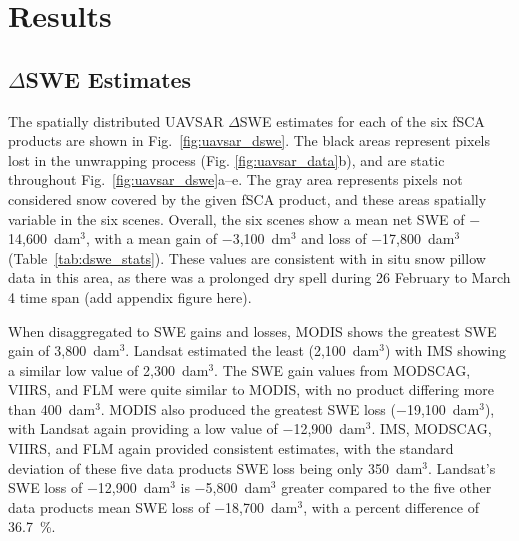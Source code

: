 \hypertarget{ch4-results}{\section{Results}\label{ch4-results}}
\hypertarget{ch4-results}{\subsection{$\Delta$SWE Estimates}\label{ch4-results}}

The spatially distributed UAVSAR $\Delta$SWE estimates for each of the six fSCA products are shown in Fig.~\ref{fig:uavsar_dswe}. The black areas represent pixels lost in the unwrapping process (Fig. \ref{fig:uavsar_data}b), and are static throughout Fig.~\ref{fig:uavsar_dswe}a--e. The gray area represents pixels not considered snow covered by the given fSCA product, and these areas spatially variable in the six scenes. Overall, the six scenes show a mean net SWE of $-$14,600~dam$^{3}$, with a mean gain of $-$3,100~dm$^{3}$ and loss of $-$17,800~dam$^{3}$ (Table~\ref{tab:dswe_stats}). These values are consistent with in situ snow pillow data in this area, as there was a prolonged dry spell during 26 February to March 4 time span (add appendix figure here).

When disaggregated to SWE gains and losses, MODIS shows the greatest SWE gain of 3,800~dam$^{3}$. Landsat estimated the least (2,100~dam$^{3}$) with IMS showing a similar low value of 2,300~dam$^{3}$. The SWE gain values from MODSCAG, VIIRS, and FLM were quite similar to MODIS, with no product differing more than 400~dam$^{3}$.
MODIS also produced the greatest SWE loss ($-$19,100~dam$^{3}$), with Landsat again providing a low value of $-$12,900~dam$^{3}$. IMS, MODSCAG, VIIRS, and FLM again provided consistent estimates, with the standard deviation of these five data products SWE loss being only 350~dam$^{3}$. Landsat's SWE loss of $-$12,900~dam$^{3}$ is $-$5,800~dam$^{3}$ greater compared to the five other data products mean SWE loss of $-$18,700~dam$^{3}$, with a percent difference of 36.7~\%.






